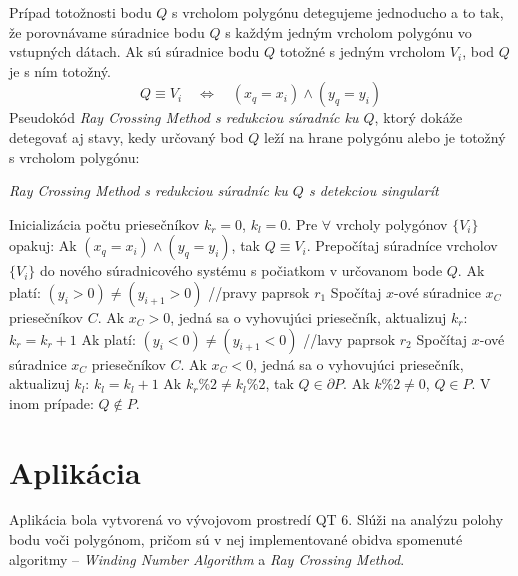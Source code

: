 \documentclass[11pt]{article}
\begin{document}
Prípad totožnosti bodu $Q$ s vrcholom polygónu detegujeme jednoducho a to tak, že porovnávame súradnice bodu $Q$ s každým jedným vrcholom polygónu vo vstupných dátach. Ak sú súradnice bodu $Q$ totožné s jedným vrcholom $V_i$, bod $Q$ je s ním totožný.
\begin{equation*}
Q \equiv V_i \quad \iff \quad (x_q=x_i)  \wedge  (y_q=y_i) 
\end{equation*}
\noindent Pseudokód \textit{Ray Crossing Method s redukciou súradníc ku $Q$}, ktorý dokáže detegovať aj stavy, kedy určovaný bod $Q$ leží na hrane polygónu alebo je totožný s vrcholom polygónu:
\begin{algorithm}
    \caption {\textit{Ray Crossing Method s redukciou súradníc ku $Q$ s detekciou singularít}}
    \begin{algorithmic}[1]
        \State Inicializácia počtu priesečníkov $k_r=0$, $k_l=0$.
        \State Pre $\forall$ vrcholy polygónov $\{V_i\}$ opakuj:
        \State \indent Ak $(x_q=x_i)  \wedge  (y_q=y_i)$, tak $Q \equiv V_i$.
        \State \indent Prepočítaj súradníce vrcholov $\{V_i\}$ do nového súradnicového systému s počiatkom v \newline \indent určovanom bode $Q$. 
        \State \indent Ak platí: $(y_i>0) \neq (y_{i+1}>0)$ \quad \quad //pravy paprsok $r_1$
        \State \indent \indent Spočítaj $x$-ové súradnice $x_C$ priesečníkov $C$.
        \State \indent \indent Ak $x_C>0$, jedná sa o vyhovujúci priesečník, aktualizuj $k_r$: $k_r=k_r+1$
        \State \indent Ak platí: $(y_i<0) \neq (y_{i+1}<0)$ \quad \quad //lavy paprsok $r_2$
        \State \indent \indent Spočítaj $x$-ové súradnice $x_C$ priesečníkov $C$.
        \State \indent \indent Ak $x_C<0$, jedná sa o vyhovujúci priesečník, aktualizuj $k_l$: $k_l=k_l+1$
        \State Ak $k_r\%2 \neq k_l\%2$, tak $Q \in \partial P$.
        \State Ak $k\%2\neq0$, $Q \in P$.
        \State V inom prípade: $Q \notin P$.
    \end{algorithmic}
\end{algorithm}


\newpage


\section{Aplikácia}
Aplikácia bola vytvorená vo vývojovom prostredí QT 6. Slúži na analýzu polohy bodu voči polygónom, pričom sú v nej implementované obidva spomenuté algoritmy -- \textit{Winding Number Algorithm} a \textit{Ray Crossing Method}. 
\end{document}
